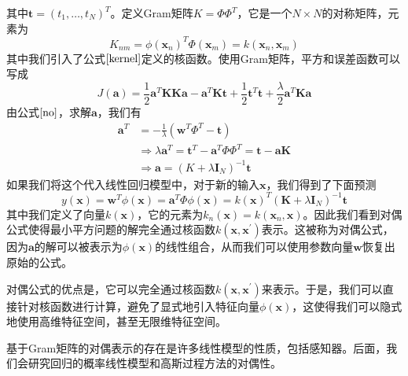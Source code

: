 其中$\boldsymbol{t}=(t_1,\dots,t_N)^T$。定义Gram矩阵$K=\Phi\Phi^T$，它是一个$N\times N$的对称矩阵，元素为
\begin{equation}
	K_{nm}=\phi(\boldsymbol{x}_n)^T\Phi(\boldsymbol{x}_m)=k(\boldsymbol{x}_n,\boldsymbol{x}_m)
\end{equation}
其中我们引入了公式$\ref{kernel}$定义的核函数。使用Gram矩阵，平方和误差函数可以写成 
\begin{equation}
	J(\boldsymbol{a})=\frac{1}{2}\boldsymbol{a}^T\boldsymbol{KK}\boldsymbol{a}-\boldsymbol{a}^T\boldsymbol{K}\boldsymbol{t}+\frac{1}{2}\boldsymbol{t}^T\boldsymbol{t}+\frac{\lambda}{2}\boldsymbol{a}^T\boldsymbol{K}\boldsymbol{a}
\end{equation}
由公式$\ref{no}$，求解$\boldsymbol{a}$，我们有
\begin{equation}
\begin{aligned}
	\boldsymbol{a}^T&=-\frac{1}{\lambda}(\boldsymbol{w}^T\Phi^T-\boldsymbol{t})\\
	&\Rightarrow \lambda \boldsymbol{a}^T= \boldsymbol{t}^T-\boldsymbol{a}^T\Phi \Phi^T=\boldsymbol{t}-\boldsymbol{a}\boldsymbol{K}\\
	&\Rightarrow \boldsymbol{a}=(K+\lambda \boldsymbol{I}_{N})^{-1}\boldsymbol{t}
\end{aligned}
\end{equation}
如果我们将这个代入线性回归模型中，对于新的输入$\boldsymbol{x}$，我们得到了下面预测
\begin{equation}
	y(\boldsymbol{x})=\boldsymbol{w}^T\phi(\boldsymbol{x})=\boldsymbol{a}^T\Phi\phi(\boldsymbol{x})=k(\boldsymbol{x})^T(\boldsymbol{K}+\lambda\boldsymbol{I}_N)^{-1}\boldsymbol{t}
\end{equation}
其中我们定义了向量$k(\boldsymbol{x})$，它的元素为$k_n(\boldsymbol{x})=k(\boldsymbol{x}_n,\boldsymbol{x})$。因此我们看到对偶公式使得最小平方问题的解完全通过核函数$k(\boldsymbol{x},\boldsymbol{x}^{'})$表示。这被称为对偶公式，因为$\boldsymbol{a}$的解可以被表示为$\phi(\boldsymbol{x})$的线性组合，从而我们可以使用参数向量$\boldsymbol{w}$恢复出原始的公式。

对偶公式的优点是，它可以完全通过核函数$k(\boldsymbol{x},\boldsymbol{x}^{'})$来表示。于是，我们可以直接针对核函数进行计算，避免了显式地引入特征向量$\phi(\boldsymbol{x})$，这使得我们可以隐式地使用高维特征空间，甚至无限维特征空间。

基于Gram矩阵的对偶表示的存在是许多线性模型的性质，包括感知器。后面，我们会研究回归的概率线性模型和高斯过程方法的对偶性。